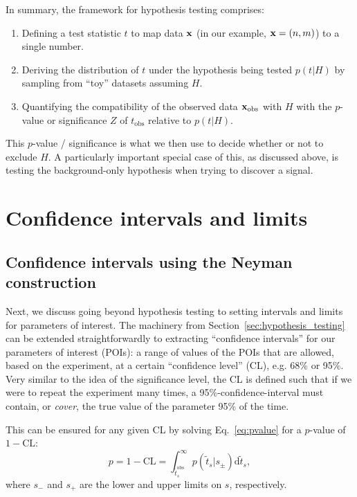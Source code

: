 
In summary, the framework for hypothesis testing comprises:

\begin{enumerate}
    \item Defining a test statistic $t$ to map data $\mathbf{x}$ (in our example, $\mathbf{x} = (n, m)$) to a single number.
    \item Deriving the distribution of $t$ under the hypothesis being tested $p(t|H)$ by sampling from ``toy'' datasets assuming $H$.
    \item Quantifying the compatibility of the observed data $\mathbf{x}_{\mathrm{obs}}$ with $H$ with the $p$-value or significance $Z$ of $t_{\mathrm{obs}}$ relative to $p(t|H)$.
\end{enumerate}

This $p$-value / significance is what we then use to decide whether or not to exclude $H$.
A particularly important special case of this, as discussed above, is testing the background-only hypothesis when trying to discover a signal.

\chapter{Confidence intervals and limits}
\label{sec:intervals}

\section{Confidence intervals using the Neyman construction}

Next, we discuss going beyond hypothesis testing to setting intervals and limits for parameters of interest.
The machinery from Section~\ref{sec:hypothesis_testing} can be extended straightforwardly to extracting ``confidence intervals'' for our parameters of interest (POIs): a range of values of the POIs that are allowed, based on the experiment, at a certain ``confidence level'' (CL), e.g. 68\% or 95\%.
Very similar to the idea of the significance level, the CL is defined such that if we were to repeat the experiment many times, a 95\%-confidence-interval must contain, or \textit{cover}, the true value of the parameter 95\% of the time.

This can be ensured for any given CL by solving Eq.~\ref{eq:pvalue} for a $p$-value of $1 - \mathrm{CL}$:
\begin{equation}
p = 1 - \mathrm{CL} = \int_{\tilde{t}^{\mathrm{obs}}_s}^{\infty}p(\tilde{t}_s|s_\pm)\mathrm d \tilde{t}_s,
\label{eq:cl}
\end{equation}
where $s_-$ and $s_+$ are the lower and upper limits on $s$, respectively.

